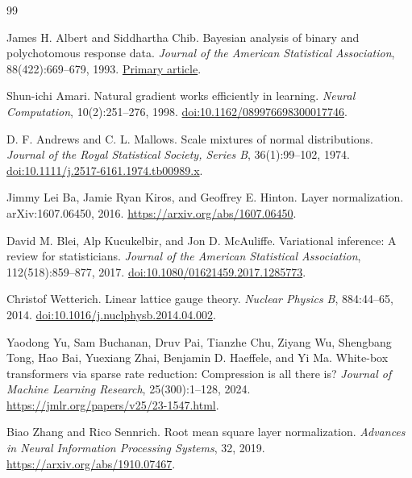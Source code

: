 \documentclass[11pt]{article}
\begin{document}
\begin{thebibliography}{99}
\raggedright
{}
James H. Albert and Siddhartha Chib.
Bayesian analysis of binary and polychotomous response data.
\emph{Journal of the American Statistical Association}, 88(422):669--679, 1993.
\href{https://stat.cmu.edu/~brian/905-2009/all-papers/albert-chib-1993.pdf}{Primary article}.

Shun-ichi Amari.
Natural gradient works efficiently in learning.
\emph{Neural Computation}, 10(2):251--276, 1998.
\href{https://doi.org/10.1162/089976698300017746}{doi:10.1162/089976698300017746}.

D. F. Andrews and C. L. Mallows.
Scale mixtures of normal distributions.
\emph{Journal of the Royal Statistical Society, Series B}, 36(1):99--102, 1974.
\href{https://doi.org/10.1111/j.2517-6161.1974.tb00989.x}{doi:10.1111/j.2517-6161.1974.tb00989.x}.

Jimmy Lei Ba, Jamie Ryan Kiros, and Geoffrey E. Hinton.
Layer normalization.
arXiv:1607.06450, 2016.
\url{https://arxiv.org/abs/1607.06450}.

David M. Blei, Alp Kucukelbir, and Jon D. McAuliffe.
Variational inference: A review for statisticians.
\emph{Journal of the American Statistical Association}, 112(518):859--877, 2017.
\href{https://doi.org/10.1080/01621459.2017.1285773}{doi:10.1080/01621459.2017.1285773}.

Christof Wetterich.
Linear lattice gauge theory.
\emph{Nuclear Physics B}, 884:44--65, 2014.
\href{https://doi.org/10.1016/j.nuclphysb.2014.04.002}{doi:10.1016/j.nuclphysb.2014.04.002}.

Yaodong Yu, Sam Buchanan, Druv Pai, Tianzhe Chu, Ziyang Wu, Shengbang Tong,
Hao Bai, Yuexiang Zhai, Benjamin D. Haeffele, and Yi Ma.
White-box transformers via sparse rate reduction: Compression is all there is?
\emph{Journal of Machine Learning Research}, 25(300):1--128, 2024.
\url{https://jmlr.org/papers/v25/23-1547.html}.

Biao Zhang and Rico Sennrich.
Root mean square layer normalization.
\emph{Advances in Neural Information Processing Systems}, 32, 2019.
\url{https://arxiv.org/abs/1910.07467}.
\end{thebibliography}
\end{document}
